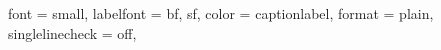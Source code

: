 
\lefoot*%
{%
	\vspace*{1 ex}%
	{\color{stroke1}\rule{\myoutermargin - \mymargininnersep}{0.5 mm}}\\
	\begin{minipage}[b]{\myoutermargin - \mymargininnersep}%
		\raggedleft\normalfont\color{footerpagenr}\textbf{\thepage}%
	\end{minipage}%
}
\rofoot*%
{%
	{\color{stroke1}\rule{\myoutermargin - \mymargininnersep}{0.5 mm}}\\
	\begin{minipage}[b]{\myoutermargin - \mymargininnersep}%
		\raggedright\normalfont\color{footerpagenr}\textbf{\thepage}%
	\end{minipage}%
}



\usepackage{caption}
\captionsetup
{
	font = small,
	labelfont = {bf, sf, color = captionlabel},
	format = plain,
	singlelinecheck = off,
}


\usepackage{tikz} %

\newlength{\mytmpa}
\setlength{\mytmpa}{1 mm}
\newlength{\mytmpb}
\newlength{\mytmpc}

